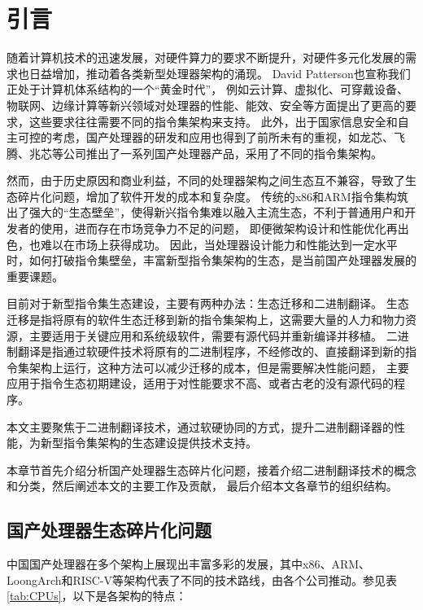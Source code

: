 \chapter{引言}\label{chap:introduction}


随着计算机技术的迅速发展，对硬件算力的要求不断提升，对硬件多元化发展的需求也日益增加，推动着各类新型处理器架构的涌现。
David Patterson也宣称我们正处于计算机体系结构的一个“黄金时代”\cite{goldenage}，
例如云计算、虚拟化、可穿戴设备、物联网、边缘计算等新兴领域对处理器的性能、能效、安全等方面提出了更高的要求，这些要求往往需要不同的指令集架构来支持。
此外，出于国家信息安全和自主可控的考虑，国产处理器的研发和应用也得到了前所未有的重视，如龙芯、飞腾、兆芯等公司推出了一系列国产处理器产品，采用了不同的指令集架构。

然而，由于历史原因和商业利益，不同的处理器架构之间生态互不兼容，导致了生态碎片化问题，增加了软件开发的成本和复杂度。
传统的x86和ARM指令集构筑出了强大的“生态壁垒”，使得新兴指令集难以融入主流生态，不利于普通用户和开发者的使用，进而存在市场竞争力不足的问题，
即便微架构设计和性能优化再出色，也难以在市场上获得成功。
因此，当处理器设计能力和性能达到一定水平时，如何打破指令集壁垒，丰富新型指令集架构的生态，是当前国产处理器发展的重要课题。

目前对于新型指令集生态建设，主要有两种办法：生态迁移和二进制翻译。
生态迁移是指将原有的软件生态迁移到新的指令集架构上，这需要大量的人力和物力资源，主要适用于关键应用和系统级软件，需要有源代码并重新编译并移植。
二进制翻译是指通过软硬件技术将原有的二进制程序，不经修改的、直接翻译到新的指令集架构上运行，这种方法可以减少迁移的成本，但是需要解决性能问题，
主要应用于指令生态初期建设，适用于对性能要求不高、或者古老的没有源代码的程序。

本文主要聚焦于二进制翻译技术，通过软硬协同的方式，提升二进制翻译器的性能，为新型指令集架构的生态建设提供技术支持。

本章节首先介绍分析国产处理器生态碎片化问题，接着介绍二进制翻译技术的概念和分类，然后阐述本文的主要工作及贡献，
最后介绍本文各章节的组织结构。

\section{国产处理器生态碎片化问题}

中国国产处理器在多个架构上展现出丰富多彩的发展，其中x86、ARM、LoongArch\cite{LoongArch2023}和RISC-V等架构代表了不同的技术路线，由各个公司推动。参见表\ref{tab:CPUs}，以下是各架构的特点：

